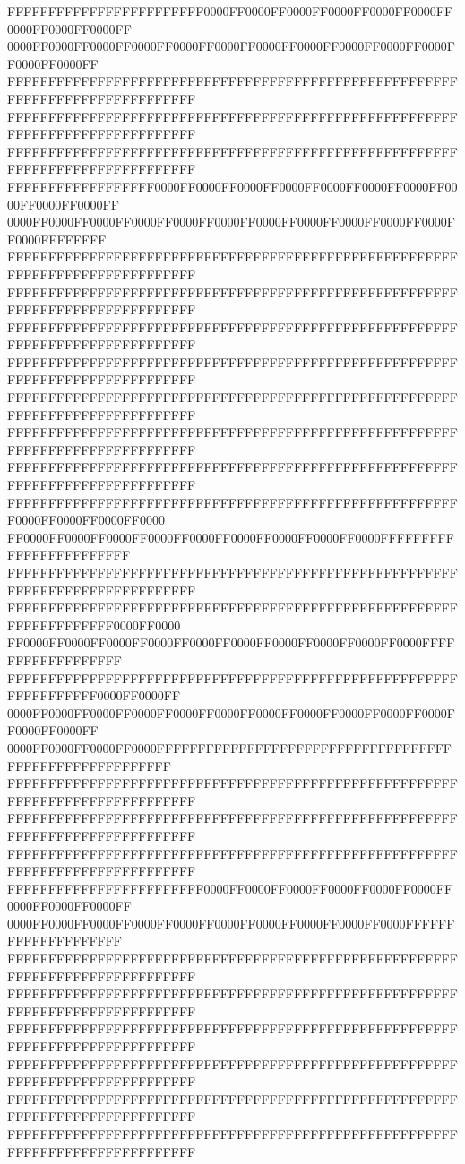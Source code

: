 FFFFFFFFFFFFFFFFFFFFFFFF0000FF0000FF0000FF0000FF0000FF0000FF0000FF0000FF0000FF
0000FF0000FF0000FF0000FF0000FF0000FF0000FF0000FF0000FF0000FF0000FF0000FF0000FF
FFFFFFFFFFFFFFFFFFFFFFFFFFFFFFFFFFFFFFFFFFFFFFFFFFFFFFFFFFFFFFFFFFFFFFFFFFFFFF
FFFFFFFFFFFFFFFFFFFFFFFFFFFFFFFFFFFFFFFFFFFFFFFFFFFFFFFFFFFFFFFFFFFFFFFFFFFFFF
FFFFFFFFFFFFFFFFFFFFFFFFFFFFFFFFFFFFFFFFFFFFFFFFFFFFFFFFFFFFFFFFFFFFFFFFFFFFFF
FFFFFFFFFFFFFFFFFF0000FF0000FF0000FF0000FF0000FF0000FF0000FF0000FF0000FF0000FF
0000FF0000FF0000FF0000FF0000FF0000FF0000FF0000FF0000FF0000FF0000FF0000FFFFFFFF
FFFFFFFFFFFFFFFFFFFFFFFFFFFFFFFFFFFFFFFFFFFFFFFFFFFFFFFFFFFFFFFFFFFFFFFFFFFFFF
FFFFFFFFFFFFFFFFFFFFFFFFFFFFFFFFFFFFFFFFFFFFFFFFFFFFFFFFFFFFFFFFFFFFFFFFFFFFFF
FFFFFFFFFFFFFFFFFFFFFFFFFFFFFFFFFFFFFFFFFFFFFFFFFFFFFFFFFFFFFFFFFFFFFFFFFFFFFF
FFFFFFFFFFFFFFFFFFFFFFFFFFFFFFFFFFFFFFFFFFFFFFFFFFFFFFFFFFFFFFFFFFFFFFFFFFFFFF
FFFFFFFFFFFFFFFFFFFFFFFFFFFFFFFFFFFFFFFFFFFFFFFFFFFFFFFFFFFFFFFFFFFFFFFFFFFFFF
FFFFFFFFFFFFFFFFFFFFFFFFFFFFFFFFFFFFFFFFFFFFFFFFFFFFFFFFFFFFFFFFFFFFFFFFFFFFFF
FFFFFFFFFFFFFFFFFFFFFFFFFFFFFFFFFFFFFFFFFFFFFFFFFFFFFFFFFFFFFFFFFFFFFFFFFFFFFF
FFFFFFFFFFFFFFFFFFFFFFFFFFFFFFFFFFFFFFFFFFFFFFFFFFFFFFFF0000FF0000FF0000FF0000
FF0000FF0000FF0000FF0000FF0000FF0000FF0000FF0000FF0000FFFFFFFFFFFFFFFFFFFFFFFF
FFFFFFFFFFFFFFFFFFFFFFFFFFFFFFFFFFFFFFFFFFFFFFFFFFFFFFFFFFFFFFFFFFFFFFFFFFFFFF
FFFFFFFFFFFFFFFFFFFFFFFFFFFFFFFFFFFFFFFFFFFFFFFFFFFFFFFFFFFFFFFFFFFF0000FF0000
FF0000FF0000FF0000FF0000FF0000FF0000FF0000FF0000FF0000FF0000FFFFFFFFFFFFFFFFFF
FFFFFFFFFFFFFFFFFFFFFFFFFFFFFFFFFFFFFFFFFFFFFFFFFFFFFFFFFFFFFFFFFF0000FF0000FF
0000FF0000FF0000FF0000FF0000FF0000FF0000FF0000FF0000FF0000FF0000FF0000FF0000FF
0000FF0000FF0000FF0000FFFFFFFFFFFFFFFFFFFFFFFFFFFFFFFFFFFFFFFFFFFFFFFFFFFFFFFF
FFFFFFFFFFFFFFFFFFFFFFFFFFFFFFFFFFFFFFFFFFFFFFFFFFFFFFFFFFFFFFFFFFFFFFFFFFFFFF
FFFFFFFFFFFFFFFFFFFFFFFFFFFFFFFFFFFFFFFFFFFFFFFFFFFFFFFFFFFFFFFFFFFFFFFFFFFFFF
FFFFFFFFFFFFFFFFFFFFFFFFFFFFFFFFFFFFFFFFFFFFFFFFFFFFFFFFFFFFFFFFFFFFFFFFFFFFFF
FFFFFFFFFFFFFFFFFFFFFFFF0000FF0000FF0000FF0000FF0000FF0000FF0000FF0000FF0000FF
0000FF0000FF0000FF0000FF0000FF0000FF0000FF0000FF0000FF0000FFFFFFFFFFFFFFFFFFFF
FFFFFFFFFFFFFFFFFFFFFFFFFFFFFFFFFFFFFFFFFFFFFFFFFFFFFFFFFFFFFFFFFFFFFFFFFFFFFF
FFFFFFFFFFFFFFFFFFFFFFFFFFFFFFFFFFFFFFFFFFFFFFFFFFFFFFFFFFFFFFFFFFFFFFFFFFFFFF
FFFFFFFFFFFFFFFFFFFFFFFFFFFFFFFFFFFFFFFFFFFFFFFFFFFFFFFFFFFFFFFFFFFFFFFFFFFFFF
FFFFFFFFFFFFFFFFFFFFFFFFFFFFFFFFFFFFFFFFFFFFFFFFFFFFFFFFFFFFFFFFFFFFFFFFFFFFFF
FFFFFFFFFFFFFFFFFFFFFFFFFFFFFFFFFFFFFFFFFFFFFFFFFFFFFFFFFFFFFFFFFFFFFFFFFFFFFF
FFFFFFFFFFFFFFFFFFFFFFFFFFFFFFFFFFFFFFFFFFFFFFFFFFFFFFFFFFFFFFFFFFFFFFFFFFFFFF
